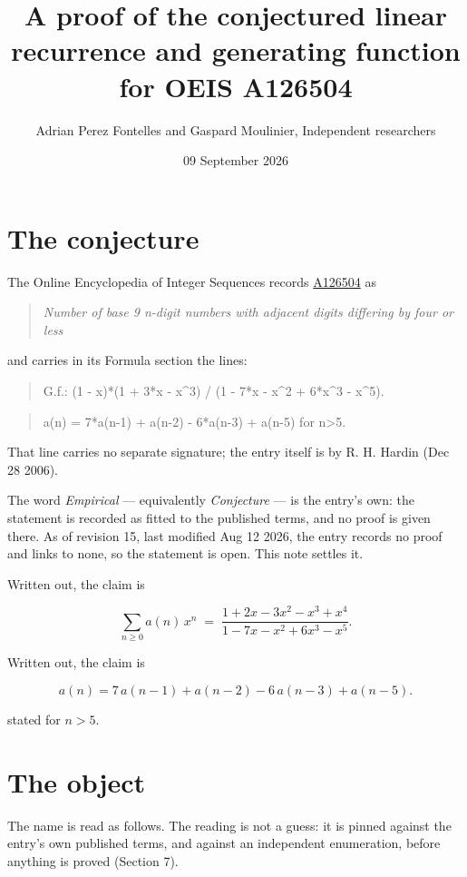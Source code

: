\documentclass[11pt]{article}
\title{A proof of the conjectured linear recurrence and generating function for OEIS A126504}
\author{Adrian Perez Fontelles and Gaspard Moulinier, Independent researchers}
\date{09 September 2026}
\theoremstyle{definition}
\begin{document}
\maketitle
\section{The conjecture}

The Online Encyclopedia of Integer Sequences records \href{https://oeis.org/A126504}{A126504} as

\begin{quote}\itshape Number of base 9 n-digit numbers with adjacent digits differing by four or less\end{quote}

and carries in its Formula section the lines:

\begin{quote}\ttfamily G.f.: (1 - x)*(1 + 3*x - x\textasciicircum{}3) / (1 - 7*x - x\textasciicircum{}2 + 6*x\textasciicircum{}3 - x\textasciicircum{}5).\end{quote}

\begin{quote}\ttfamily a(n) = 7*a(n-1) + a(n-2) - 6*a(n-3) + a(n-5) for n>5.\end{quote}

That line carries no separate signature; the entry itself is by R. H. Hardin (Dec 28 2006).

The word {\itshape Empirical} --- equivalently {\itshape Conjecture} --- is the entry's own: the statement is recorded as fitted to the published terms, and no proof is given there. As of revision 15, last modified Aug 12 2026, the entry records no proof and links to none, so the statement is open. This note settles it.

Written out, the claim is

\[\sum_{n \ge 0} a(n)\,x^n \;=\; \frac{1 + 2x - 3x^{2} - x^{3} + x^{4}}{1 - 7x - x^{2} + 6x^{3} - x^{5}}.\]

Written out, the claim is

\[a(n) = 7\,a(n-1) + a(n-2) - 6\,a(n-3) + a(n-5).\]

stated for $n > 5$.

\section{The object}

The name is read as follows. The reading is not a guess: it is pinned against the entry's own published terms, and against an independent enumeration, before anything is proved (Section 7).
\end{document}
